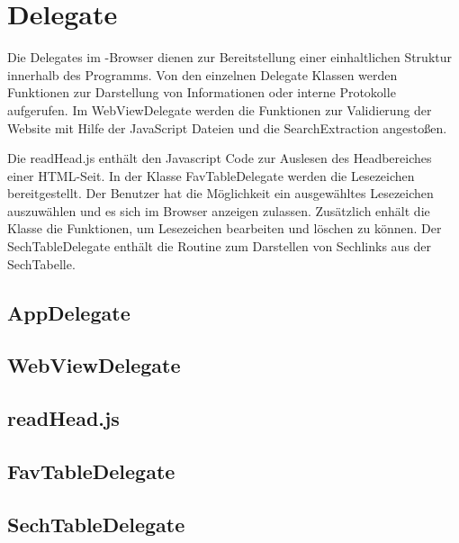
\section{Delegate}

Die Delegates im \SECH-Browser dienen zur Bereitstellung einer einhaltlichen Struktur innerhalb des Programms. Von den einzelnen Delegate Klassen werden Funktionen zur Darstellung von Informationen oder interne Protokolle aufgerufen. Im WebViewDelegate werden die Funktionen zur Validierung der Website mit Hilfe der JavaScript Dateien und die SearchExtraction angestoßen.

Die readHead.js enthält den Javascript Code zur Auslesen des Headbereiches einer HTML-Seit. In der Klasse FavTableDelegate werden die Lesezeichen bereitgestellt. Der Benutzer hat die Möglichkeit ein ausgewähltes Lesezeichen auszuwählen und es sich im Browser anzeigen zulassen. Zusätzlich enhält die Klasse die Funktionen, um Lesezeichen bearbeiten und löschen zu können. Der SechTableDelegate enthält die Routine zum Darstellen von Sechlinks aus der SechTabelle. 
\subsection{AppDelegate}
\subsection{WebViewDelegate}
\subsection{readHead.js}
\subsection{FavTableDelegate}
\subsection{SechTableDelegate}

